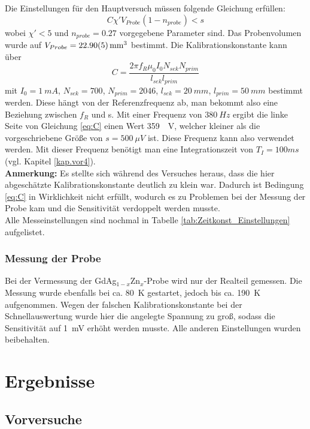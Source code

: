 \documentclass[12pt,a4paper]{article}
\begin{document}
Die Einstellungen für den Hauptversuch müssen folgende Gleichung erfüllen:
\begin{equation}
C \chi' V_{Probe} (1-n_{probe})< s
\label{eq:C}
\end{equation}
wobei $\chi' < 5$ und $n_{probe} = 0.27$ vorgegebene Parameter sind. Das Probenvolumen wurde auf $V_{Probe} = \SI{22,90 \pm 0,05}{mm^3}$ bestimmt. Die Kalibrationskonstante kann über
\begin{equation*}
C = \dfrac{2\pi f_R \mu_0 I_0 N_{sek} N_{prim}}{l_{sek} l_{prim}}
\end{equation*}
mit $I_0 = \SI{1}{mA}$, $N_{sek} = 700$, $N_{prim} = 2046$, $l_{sek} = \SI{20}{mm}$, $l_{prim} = \SI{50}{mm}$ bestimmt werden. Diese hängt von der Referenzfrequenz ab, man bekommt also eine Beziehung zwischen $f_R$ und s. Mit einer Frequenz von $\SI{380}{Hz}$ ergibt die linke Seite von Gleichung \ref{eq:C} einen Wert \SI{359}{\mu V}, welcher kleiner als die vorgeschriebene Größe von $s = \SI{500}{\mu V}$ ist. Diese Frequenz kann also verwendet werden. Mit dieser Frequenz benötigt man eine Integrationszeit von $T_I = 100ms$ (vgl. Kapitel \ref{kap.vor4}).\\
\textbf{Anmerkung:} Es stellte sich während des Versuches heraus, dass die hier abgeschätzte Kalibrationskonstante deutlich zu klein war. Dadurch ist Bedingung \ref{eq:C} in Wirklichkeit nicht erfüllt, wodurch es zu Problemen bei der Messung der Probe kam und die Sensitivität verdoppelt werden musste.\\
Alle Messeinstellungen sind nochmal in Tabelle \ref{tab:Zeitkonst_Einstellungen} aufgelistet.

\subsubsection{Messung der Probe}
Bei der Vermessung der GdAg$_{1-x}$Zn$_x$-Probe wird nur der Realteil gemessen. Die Messung wurde ebenfalls bei ca. \SI{80}{K} gestartet, jedoch bis ca. \SI{190}{K} aufgenommen. Wegen der falschen Kalibrationskonstante bei der Schnellauswertung wurde hier die angelegte Spannung zu groß, sodass die Sensitivität auf \SI{1}{mV} erhöht werden musste. Alle anderen Einstellungen wurden beibehalten.

\section{Ergebnisse}
\subsection{Vorversuche}
\end{document}
